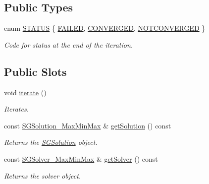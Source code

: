 \subsection*{Public Types}
\begin{DoxyCompactItemize}
\item 
enum \hyperlink{classSGSolverWorker__V2_a252099560187dceadfe97c1bd335c561}{S\+T\+A\+T\+US} \{ \hyperlink{classSGSolverWorker__V2_a252099560187dceadfe97c1bd335c561aac3497bdaf25de1e84fba1d717d09aa9}{F\+A\+I\+L\+ED}, 
\hyperlink{classSGSolverWorker__V2_a252099560187dceadfe97c1bd335c561a08c3f1a894b6925e658b5b8e0e84e921}{C\+O\+N\+V\+E\+R\+G\+ED}, 
\hyperlink{classSGSolverWorker__V2_a252099560187dceadfe97c1bd335c561a28ac2db5d167e970a06341f9c934766d}{N\+O\+T\+C\+O\+N\+V\+E\+R\+G\+ED}
 \}\begin{DoxyCompactList}\small\item\em Code for status at the end of the iteration. \end{DoxyCompactList}
\end{DoxyCompactItemize}
\subsection*{Public Slots}
\begin{DoxyCompactItemize}
\item 
void \hyperlink{classSGSolverWorker__V2_a3b7099cf8b559184743bca1eba3fa00e}{iterate} ()
\begin{DoxyCompactList}\small\item\em Iterates. \end{DoxyCompactList}\item 
\mbox{\label{classSGSolverWorker__V2_a5a2df3d8a1a53546222cc6586d49c777}} 
const \hyperlink{classSGSolution__MaxMinMax}{S\+G\+Solution\+\_\+\+Max\+Min\+Max} \& \hyperlink{classSGSolverWorker__V2_a5a2df3d8a1a53546222cc6586d49c777}{get\+Solution} () const
\begin{DoxyCompactList}\small\item\em Returns the \hyperlink{classSGSolution}{S\+G\+Solution} object. \end{DoxyCompactList}\item 
\mbox{\label{classSGSolverWorker__V2_a9d9ba096eec2eb0a693f3aac5cc6f058}} 
const \hyperlink{classSGSolver__MaxMinMax}{S\+G\+Solver\+\_\+\+Max\+Min\+Max} \& \hyperlink{classSGSolverWorker__V2_a9d9ba096eec2eb0a693f3aac5cc6f058}{get\+Solver} () const
\begin{DoxyCompactList}\small\item\em Returns the solver object. \end{DoxyCompactList}\end{DoxyCompactItemize}
